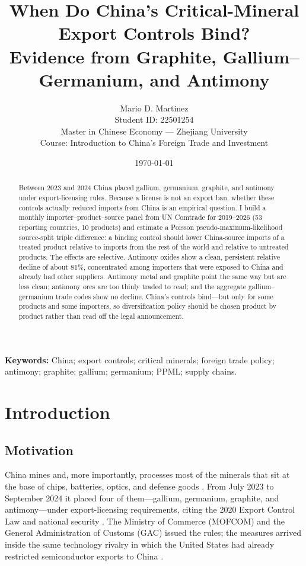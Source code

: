 \documentclass[12pt,a4paper]{article}
\title{\bfseries When Do China's Critical-Mineral Export Controls Bind?\\[4pt]
\large\normalfont Evidence from Graphite, Gallium--Germanium, and Antimony}
\author{Mario D. Martinez\\[2pt]
\small Student ID: 22501254\\
\small Master in Chinese Economy --- Zhejiang University\\
\small Course: Introduction to China's Foreign Trade and Investment}
\date{\today}
\begin{document}
\maketitle

\begin{abstract}
\noindent
Between 2023 and 2024 China placed gallium, germanium, graphite, and antimony
under export-licensing rules. Because a license is not an export ban, whether
these controls actually reduced imports from China is an empirical question. I
build a monthly importer--product--source panel from UN Comtrade for
2019--2026 (53 reporting countries, 10 products) and estimate a Poisson
pseudo-maximum-likelihood source-split triple difference: a binding control
should lower China-source imports of a treated product relative to imports from
the rest of the world and relative to untreated products. The effects are
selective. Antimony oxides show a clean, persistent relative decline of about
81\%, concentrated among importers that were exposed to China and already had
other suppliers. Antimony metal and graphite point the same way but are less
clean; antimony ores are too thinly traded to read; and the aggregate
gallium--germanium trade codes show no decline. China's controls bind---but
only for some products and some importers, so diversification policy should be
chosen product by product rather than read off the legal announcement.
\end{abstract}

\medskip
\noindent\textbf{Keywords:} China; export controls; critical minerals; foreign
trade policy; antimony; graphite; gallium; germanium; PPML; supply chains.

\newpage
\tableofcontents
\newpage

\section{Introduction}\label{sec:intro}

\subsection{Motivation}

China mines and, more importantly, processes most of the minerals that sit at
the base of chips, batteries, optics, and defense goods
\citep{iea_2025_global_critical_minerals_outlook}. From July 2023 to September
2024 it placed four of them---gallium, germanium, graphite, and antimony---under
export-licensing requirements, citing the 2020 Export Control Law and national
security \citep{prc_2020_export_control_law}. The Ministry of Commerce (MOFCOM)
and the General Administration of Customs (GAC) issued the rules; the measures
arrived inside the same technology rivalry in which the United States had
already restricted semiconductor exports to China
\citep{bown-2020-howunitedstates, bown2024semiconductors}.
\end{document}
